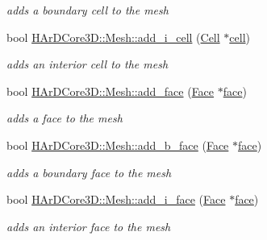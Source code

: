 \begin{DoxyCompactItemize}
\begin{DoxyCompactList}\small\item\em adds a boundary cell to the mesh \end{DoxyCompactList}\item 
\mbox{\label{group__Mesh_gaecf50e57da45ad71c485f1e3f51d82ea}} 
bool \hyperlink{group__Mesh_gaecf50e57da45ad71c485f1e3f51d82ea}{H\+Ar\+D\+Core3\+D\+::\+Mesh\+::add\+\_\+i\+\_\+cell} (\hyperlink{classHArDCore3D_1_1Cell}{Cell} $\ast$\hyperlink{classHArDCore3D_1_1Mesh_ae07b938c57cf57e3bb9c76d3df1eb549}{cell})
\begin{DoxyCompactList}\small\item\em adds an interior cell to the mesh \end{DoxyCompactList}\item 
\mbox{\label{group__Mesh_ga37af87e0b0fbb14363b2af7106231d1e}} 
bool \hyperlink{group__Mesh_ga37af87e0b0fbb14363b2af7106231d1e}{H\+Ar\+D\+Core3\+D\+::\+Mesh\+::add\+\_\+face} (\hyperlink{classHArDCore3D_1_1Face}{Face} $\ast$\hyperlink{classHArDCore3D_1_1Mesh_a09d8a0ee1f515991b06a3517e33a894e}{face})
\begin{DoxyCompactList}\small\item\em adds a face to the mesh \end{DoxyCompactList}\item 
\mbox{\label{group__Mesh_ga3efbbd1fc6718b9110bc08cc0225471c}} 
bool \hyperlink{group__Mesh_ga3efbbd1fc6718b9110bc08cc0225471c}{H\+Ar\+D\+Core3\+D\+::\+Mesh\+::add\+\_\+b\+\_\+face} (\hyperlink{classHArDCore3D_1_1Face}{Face} $\ast$\hyperlink{classHArDCore3D_1_1Mesh_a09d8a0ee1f515991b06a3517e33a894e}{face})
\begin{DoxyCompactList}\small\item\em adds a boundary face to the mesh \end{DoxyCompactList}\item 
\mbox{\label{group__Mesh_ga11ec925f03b38f68cc942c096a93af19}} 
bool \hyperlink{group__Mesh_ga11ec925f03b38f68cc942c096a93af19}{H\+Ar\+D\+Core3\+D\+::\+Mesh\+::add\+\_\+i\+\_\+face} (\hyperlink{classHArDCore3D_1_1Face}{Face} $\ast$\hyperlink{classHArDCore3D_1_1Mesh_a09d8a0ee1f515991b06a3517e33a894e}{face})
\begin{DoxyCompactList}\small\item\em adds an interior face to the mesh \end{DoxyCompactList}\item 

\end{DoxyCompactItemize}
